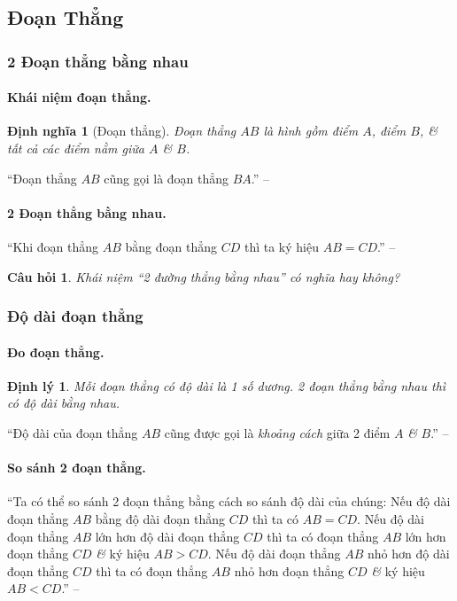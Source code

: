 \documentclass{article}
\numberwithin{equation}{section}
\newtheorem{dinhnghia}{Định nghĩa}[section]
\newtheorem{cauhoi}{Câu hỏi}[section]
\newtheorem{dinhly}{Định lý}[section]
\begin{document}
\subsection{Đoạn Thẳng}

\subsubsection{2 Đoạn thẳng bằng nhau}

\paragraph{Khái niệm đoạn thẳng.}
\begin{dinhnghia}[Đoạn thẳng]
	\emph{Đoạn thẳng $AB$} là hình gồm điểm $A$, điểm $B$, \textit{\&} tất cả các điểm nằm giữa $A$ \textit{\&} $B$.
\end{dinhnghia}
``Đoạn thẳng $AB$ cũng gọi là đoạn thẳng $BA$.'' -- \cite[p. 84]{SGK_Toan_6_Canh_Dieu_tap_2}

\paragraph{2 Đoạn thẳng bằng nhau.} ``Khi đoạn thẳng $AB$ bằng đoạn thẳng $CD$ thì ta ký hiệu $AB = CD$.'' -- \cite[p. 85]{SGK_Toan_6_Canh_Dieu_tap_2}

\begin{cauhoi}
	Khái niệm ``2 đường thẳng bằng nhau'' có nghĩa hay không?
\end{cauhoi}

\subsubsection{Độ dài đoạn thẳng}

\paragraph{Đo đoạn thẳng.}
\begin{dinhly}
	Mỗi đoạn thẳng có độ dài là 1 số dương. 2 đoạn thẳng bằng nhau thì có độ dài bằng nhau.
\end{dinhly}
``Độ dài của đoạn thẳng $AB$ cũng được gọi là \textit{khoảng cách} giữa 2 điểm $A$ \textit{\&} $B$.'' -- \cite[p. 85]{SGK_Toan_6_Canh_Dieu_tap_2}

\paragraph{So sánh 2 đoạn thẳng.} ``Ta có thể so sánh 2 đoạn thẳng bằng cách so sánh độ dài của chúng: Nếu độ dài đoạn thẳng $AB$ bằng độ dài đoạn thẳng $CD$ thì ta có $AB = CD$. Nếu độ dài đoạn thẳng $AB$ lớn hơn độ dài đoạn thẳng $CD$ thì ta có đoạn thẳng $AB$ lớn hơn đoạn thẳng $CD$ \textit{\&} ký hiệu $AB > CD$. Nếu độ dài đoạn thẳng $AB$ nhỏ hơn độ dài đoạn thẳng $CD$ thì ta có đoạn thẳng $AB$ nhỏ hơn đoạn thẳng $CD$ \textit{\&} ký hiệu $AB < CD$.'' -- \cite[p. 86]{SGK_Toan_6_Canh_Dieu_tap_2}
\end{document}
